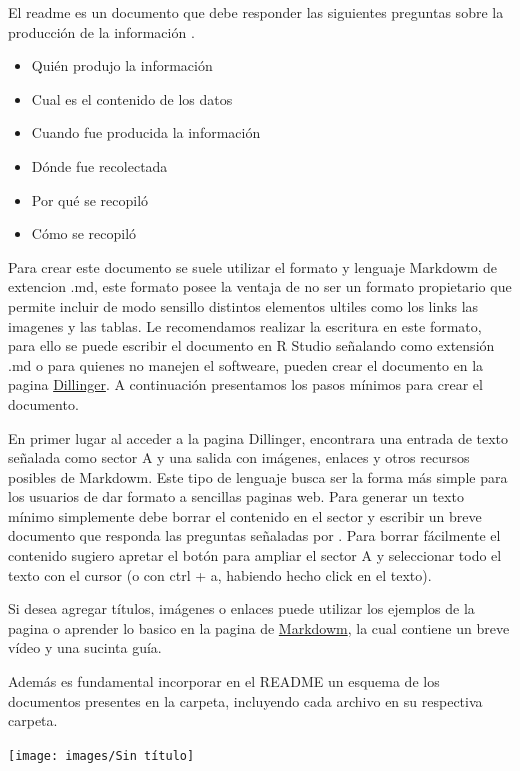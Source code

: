 \documentclass[
  14pt,
]{book}
\begin{document}
El readme es un documento que debe responder las siguientes preguntas sobre la producción de la información \citep{tierney_Realistic_2020}.

\begin{itemize}
\item
  Quién produjo la información
\item
  Cual es el contenido de los datos
\item
  Cuando fue producida la información
\item
  Dónde fue recolectada
\item
  Por qué se recopiló
\item
  Cómo se recopiló
\end{itemize}

Para crear este documento se suele utilizar el formato y lenguaje Markdowm de extencion .md, este formato posee la ventaja de no ser un formato propietario que permite incluir de modo sensillo distintos elementos ultiles como los links las imagenes y las tablas. Le recomendamos realizar la escritura en este formato, para ello se puede escribir el documento en R Studio señalando como extensión .md o para quienes no manejen el softweare, pueden crear el documento en la pagina \href{https://dillinger.io/}{Dillinger}. A continuación presentamos los pasos mínimos para crear el documento.

En primer lugar al acceder a la pagina Dillinger, encontrara una entrada de texto señalada como sector A y una salida con imágenes, enlaces y otros recursos posibles de Markdowm. Este tipo de lenguaje busca ser la forma más simple para los usuarios de dar formato a sencillas paginas web. Para generar un texto mínimo simplemente debe borrar el contenido en el sector y escribir un breve documento que responda las preguntas señaladas por \citep{tierney_Realistic_2020}. Para borrar fácilmente el contenido sugiero apretar el botón para ampliar el sector A y seleccionar todo el texto con el cursor (o con ctrl + a, habiendo hecho click en el texto).

Si desea agregar títulos, imágenes o enlaces puede utilizar los ejemplos de la pagina o aprender lo basico en la pagina de \href{https://markdown.es/sintaxis-markdown/}{Markdowm}, la cual contiene un breve vídeo y una sucinta guía.

Además es fundamental incorporar en el README un esquema de los documentos presentes en la carpeta, incluyendo cada archivo en su respectiva carpeta.

\begin{center}\texttt{[image: images/Sin título]} \end{center}
\end{document}
